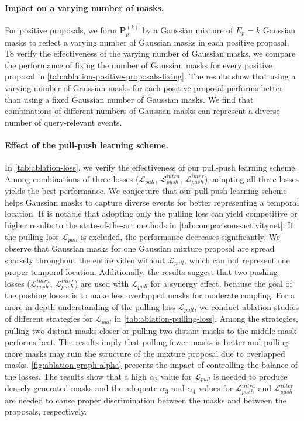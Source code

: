 \paragraph{Impact on a varying number of masks.}
For positive proposals, we form $\mathbf{P}_{p}^{(k)}$ by a Gaussian mixture of $E_p=k$ Gaussian masks to reflect a varying number of Gaussian masks in each positive proposal.
To verify the effectiveness of the varying number of Gaussian masks, we compare the performance of fixing the number of Gaussian masks for every positive proposal in \cref{tab:ablation-positive-proposals-fixing}.
The results show that using a varying number of Gaussian masks for each positive proposal performs better than using a fixed Gaussian number of Gaussian masks.
We find that combinations of different numbers of Gaussian masks can represent a diverse number of query-relevant events.




\paragraph{Effect of the pull-push learning scheme.}
In \cref{tab:ablation-loss}, we verify the effectiveness of our pull-push learning scheme.
Among combinations of three losses ($\mathcal{L}_{pull}$, $\mathcal{L}^{intra}_{push}$, $\mathcal{L}^{inter}_{push}$), adopting all three losses yields the best performance.
We conjecture that our pull-push learning scheme helps Gaussian masks to capture diverse events for better representing a temporal location.
It is notable that adopting only the pulling loss can yield competitive or higher results to the state-of-the-art methods in \cref{tab:comparisons-activitynet}.
If the pulling loss $\mathcal{L}_{pull}$ is excluded, the performance decreases significantly.
We observe that Gaussian masks for one Gaussian mixture proposal are spread sparsely throughout the entire video without $\mathcal{L}_{pull}$, which can not represent one proper temporal location.
Additionally, the results suggest that two pushing losses ($\mathcal{L}^{intra}_{push}$, $\mathcal{L}^{inter}_{push}$) are used with $\mathcal{L}_{pull}$ for a synergy effect, because the goal of the pushing losses is to make less overlapped masks for moderate coupling.
For a more in-depth understanding of the pulling loss $\mathcal{L}_{pull}$, we conduct ablation studies of different strategies for $\mathcal{L}_{pull}$ in \cref{tab:ablation-pulling-loss}.
Among the strategies, pulling two distant masks closer or pulling two distant masks to the middle mask performs best.
The results imply that pulling fewer masks is better and pulling more masks may ruin the structure of the mixture proposal due to overlapped masks.
\cref{fig:ablation-graph-alpha} presents the impact of controlling the balance of the losses.
The results show that a high $\alpha_2$ value for $\mathcal{L}_{pull}$ is needed to produce densely generated masks and the adequate $\alpha_3$ and $\alpha_4$ values for $\mathcal{L}^{intra}_{push}$ and $\mathcal{L}^{inter}_{push}$ are needed to cause proper discrimination between the masks and between the proposals, respectively.

